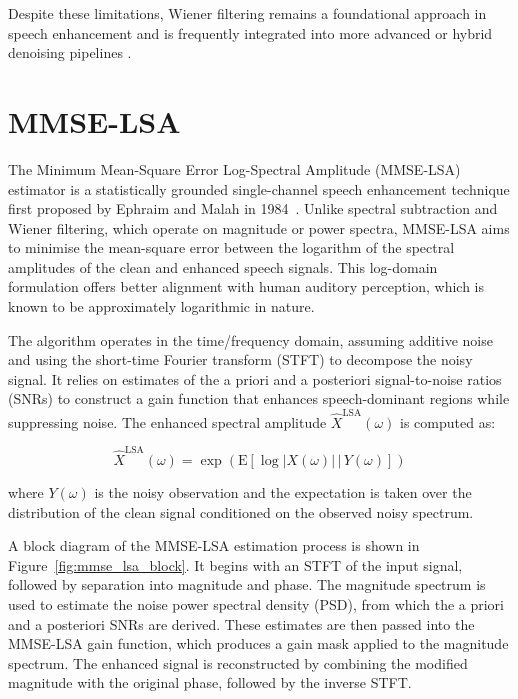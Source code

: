 Despite these limitations, Wiener filtering remains a foundational approach in speech enhancement and is frequently integrated into more advanced or hybrid denoising pipelines \cite{dubey2016evaluation, loizou2013speech}.


\section{MMSE-LSA}
\label{sec:mmse_lsa}

The Minimum Mean-Square Error Log-Spectral Amplitude (MMSE-LSA) estimator is a statistically grounded single-channel speech enhancement technique first proposed by Ephraim and Malah in 1984~\cite{ephraim1984speech}. Unlike spectral subtraction and Wiener filtering, which operate on magnitude or power spectra, MMSE-LSA aims to minimise the mean-square error between the logarithm of the spectral amplitudes of the clean and enhanced speech signals. This log-domain formulation offers better alignment with human auditory perception, which is known to be approximately logarithmic in nature.

The algorithm operates in the time/frequency domain, assuming additive noise and using the short-time Fourier transform (STFT) to decompose the noisy signal. It relies on estimates of the a priori and a posteriori signal-to-noise ratios (SNRs) to construct a gain function that enhances speech-dominant regions while suppressing noise. The enhanced spectral amplitude \( \hat{X}^{\text{LSA}}(\omega) \) is computed as:

\begin{equation}
    \hat{X}^{\text{LSA}}(\omega) = \exp \left( \mathrm{E} \left[ \log |X(\omega)| \,\big|\, Y(\omega) \right] \right)
\end{equation}

where \( Y(\omega) \) is the noisy observation and the expectation is taken over the distribution of the clean signal conditioned on the observed noisy spectrum.

A block diagram of the MMSE-LSA estimation process is shown in Figure~\ref{fig:mmse_lsa_block}. It begins with an STFT of the input signal, followed by separation into magnitude and phase. The magnitude spectrum is used to estimate the noise power spectral density (PSD), from which the a priori and a posteriori SNRs are derived. These estimates are then passed into the MMSE-LSA gain function, which produces a gain mask applied to the magnitude spectrum. The enhanced signal is reconstructed by combining the modified magnitude with the original phase, followed by the inverse STFT.

